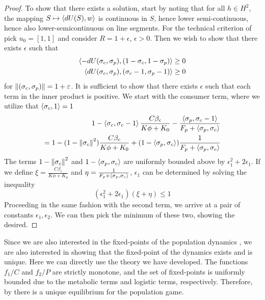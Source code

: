 \begin{proof}
  To show that there exists a solution, start by noting that for all $h\in H^2$, the mapping $S \mapsto \left \langle dU(S),w \right \rangle$ is continuous in $S$, hence lower semi-continuous, hence also lower-semicontinuous on line segments.
  For the technical criterion of  pick $u_0 = [1,1]$ and consider $R=1+\epsilon$, $\epsilon>0$. Then we wish to show that there exists $\epsilon$ such that
  \begin{equation}
    \begin{split}
    \left \langle -dU(\sigma_c,\sigma_p),(1-\sigma_c, 1-\sigma_p) \right \rangle \geq 0 \\
    \left \langle dU(\sigma_c,\sigma_p),(\sigma_c-1, \sigma_p-1) \right \rangle \geq 0
  \end{split}
  \end{equation}
  for $\left \Vert (\sigma_c,\sigma_p) \right \Vert = 1+\varepsilon$.
  It is sufficient to show that there exists $\epsilon$ such that each term in the inner product is positive. We start with the consumer term, where we utilize that $\left \langle \sigma_c,1 \right \rangle=1$
  \begin{equation}
    \begin{split}
    1-\ip{\sigma_c}{\sigma_c-1}\frac{ C \beta_c }{K\phi + K_0} - \frac{\ip{\sigma_p}{\sigma_c-1}}{F_p + \ip{\sigma_p}{\sigma_c}} \\
     =1-(1-\norm{\sigma_c}^2)\frac{ C \beta_c }{K\phi + K_0}+(1-\ip{\sigma_p}{\sigma_c})\frac{1}{F_p + \ip{\sigma_p}{\sigma_c}}
  \end{split}
  \end{equation}
  The terms $1-\left \Vert \sigma_c \right \Vert^2$ and $1-\left \langle \sigma_p,\sigma_c \right \rangle$ are uniformly bounded above by $\epsilon_1^2+2\epsilon_1$. If we define $\xi = \frac{C \beta_c }{K\phi + K_0}$ and $\eta = \frac{1}{F_p + \left \langle \sigma_p,\sigma_c \right \rangle}$, $\epsilon_1$ can be determined by solving the inequality
  \begin{equation}
    (\epsilon_1^2+2\epsilon_1)(\xi+\eta) \leq 1
  \end{equation}
  Proceeding in the same fashion with the second term, we arrive at a pair of constants $\epsilon_1,\epsilon_2$. We can then pick the minimum of these two, showing the desired.
\end{proof}
Since we are also interested in the fixed-points of the population dynamics , we are also interested in showing that the fixed-point of the dynamics exists and is unique. Here we can directly use the theory we have developed.  The functions $f_1/C$ and $f_2/P$ are strictly monotone, and the set of fixed-points is uniformly bounded due to the metabolic terms and logistic terms, respectively. Therefore, by  there is a unique equilibrium for the population game.


